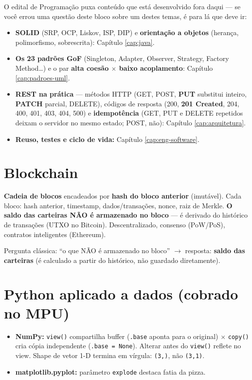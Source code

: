 \begin{conceito}
O edital de Programação puxa conteúdo que está desenvolvido fora daqui ---
se você errou uma questão deste bloco sobre um destes temas, é para lá que
deve ir:
\begin{itemize}
\item \textbf{SOLID} (SRP, OCP, Liskov, ISP, DIP) e \textbf{orientação a
objetos} (herança, polimorfismo, sobrescrita): Capítulo \ref{cap:java}.
\item \textbf{Os 23 padrões GoF} (Singleton, Adapter, Observer, Strategy,
Factory Method\ldots) e o par \textbf{alta coesão $\times$ baixo
acoplamento}: Capítulo \ref{cap:padroes-uml}.
\item \textbf{REST na prática} --- métodos HTTP (GET, POST, \textbf{PUT}
substitui inteiro, \textbf{PATCH} parcial, DELETE), códigos de resposta
(200, \textbf{201 Created}, 204, 400, 401, 403, 404, 500) e
\textbf{idempotência} (GET, PUT e DELETE repetidos deixam o servidor no
mesmo estado; POST, não): Capítulo \ref{cap:arquitetura}.
\item \textbf{Reuso, testes e ciclo de vida:} Capítulo
\ref{cap:eng-software}.
\end{itemize}
\end{conceito}

\section{Blockchain}

\textbf{Cadeia de blocos} encadeados por \textbf{hash do bloco anterior}
(imutável). Cada bloco: hash anterior, timestamp, dados/transações, nonce,
raiz de Merkle. \textbf{O saldo das carteiras NÃO é armazenado no bloco} ---
é derivado do histórico de transações (UTXO no Bitcoin). Descentralizado,
consenso (PoW/PoS), contratos inteligentes (Ethereum).

\begin{pegadinha}
Pergunta clássica: ``o que NÃO é armazenado no bloco'' $\to$ resposta:
\textbf{saldo das carteiras} (é calculado a partir do histórico, não
guardado diretamente).
\end{pegadinha}

\section{Python aplicado a dados (cobrado no MPU)}

\begin{itemize}
\item \textbf{NumPy:} \texttt{view()} compartilha buffer (\texttt{.base}
aponta para o original) $\times$ \texttt{copy()} cria cópia independente
(\texttt{.base = None}). Alterar antes do \texttt{view()} reflete no view.
Shape de vetor 1-D termina em vírgula: \texttt{(3,)}, não \texttt{(3,1)}.
\item \textbf{matplotlib.pyplot:} parâmetro \texttt{explode} destaca fatia
da pizza.
\end{itemize}


